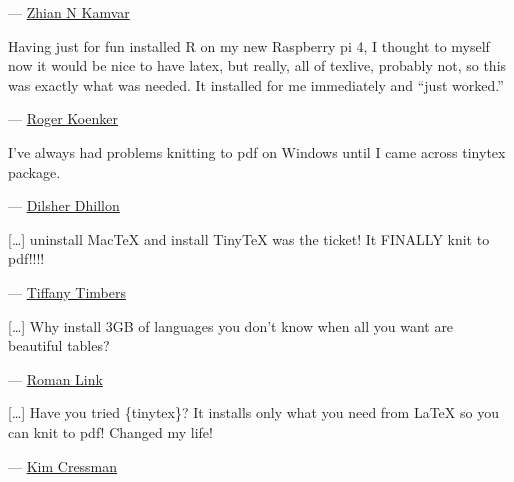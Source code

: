 \documentclass[
  xelatex,ja=standard,jafont=noto]{bxjsreport}
\renewenvironment{quote}{\def\FrameCommand{{\color{quotebarcolor}{\vrule width 3pt}}\hspace{10pt}}\MakeFramed{\advance\hsize-\width\FrameRestore}}{\endMakeFramed}
\begin{document}
\begin{quote}
--- \href{https://twitter.com/ZKamvar/status/1202525888031657984}{Zhian
N Kamvar}
\end{quote}

\begin{quote}
Having just for fun installed R on my new Raspberry pi 4, I thought to
myself now it would be nice to have latex, but really, all of texlive,
probably not, so this was exactly what was needed. It installed for me
immediately and ``just worked.''
\end{quote}

\begin{quote}
--- \href{/tinytex/\#comment-4720783918}{Roger Koenker}
\end{quote}

\begin{quote}
I've always had problems knitting to pdf on Windows until I came across
tinytex package.
\end{quote}

\begin{quote}
---
\href{https://twitter.com/dhillon_stats/status/1214204113359179779}{Dilsher
Dhillon}
\end{quote}

\begin{quote}
{[}\ldots{]} uninstall MacTeX and install TinyTeX was the ticket! It
FINALLY knit to pdf!!!!
\end{quote}

\begin{quote}
---
\href{https://twitter.com/TiffanyTimbers/status/1214344978769403905}{Tiffany
Timbers}
\end{quote}

\begin{quote}
{[}\ldots{]} Why install 3GB of languages you don't know when all you
want are beautiful tables?
\end{quote}

\begin{quote}
---
\href{https://twitter.com/RomanMLink/status/1227496566157524992}{Roman
Link}
\end{quote}

\begin{quote}
{[}\ldots{]} Have you tried \{tinytex\}? It installs only what you need
from LaTeX so you can knit to pdf! Changed my life!
\end{quote}

\begin{quote}
--- \href{https://twitter.com/swmpkim/status/1234517924028784640}{Kim
Cressman}
\end{quote}
\end{document}

